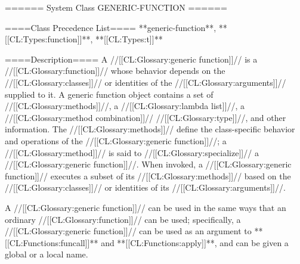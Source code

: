 ====== System Class GENERIC-FUNCTION ======

====Class Precedence List====
**generic-function**, **[[CL:Types:function]]**, **[[CL:Types:t]]**

====Description====
A //[[CL:Glossary:generic function]]// is a //[[CL:Glossary:function]]// whose behavior depends on the //[[CL:Glossary:classes]]// or identities of the //[[CL:Glossary:arguments]]// supplied to it. A generic function object contains a set of //[[CL:Glossary:methods]]//, a //[[CL:Glossary:lambda list]]//, a //[[CL:Glossary:method combination]]// //[[CL:Glossary:type]]//, and other information. The //[[CL:Glossary:methods]]// define the class-specific behavior and operations of the //[[CL:Glossary:generic function]]//; a //[[CL:Glossary:method]]// is said to //[[CL:Glossary:specialize]]// a //[[CL:Glossary:generic function]]//. When invoked, a //[[CL:Glossary:generic function]]// executes a subset of its //[[CL:Glossary:methods]]// based on the //[[CL:Glossary:classes]]// or identities of its //[[CL:Glossary:arguments]]//.

A //[[CL:Glossary:generic function]]// can be used in the same ways that an ordinary //[[CL:Glossary:function]]// can be used; specifically, a //[[CL:Glossary:generic function]]// can be used as an argument to **[[CL:Functions:funcall]]** and **[[CL:Functions:apply]]**, and can be given a global or a local name.

